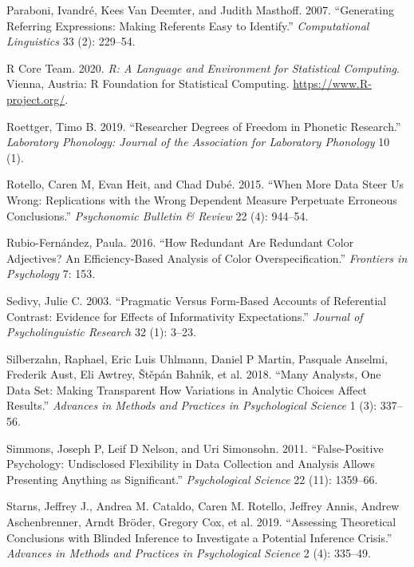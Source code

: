 \documentclass[
  12pt,
]{article}
\newlength{\cslhangindent}
\newenvironment{CSLReferences}[2] %
 {%
  \setlength{\parindent}{0pt}
  \ifodd #1 \everypar{\setlength{\hangindent}{\cslhangindent}}\ignorespaces\fi
  \ifnum #2 > 0
  \setlength{\parskip}{#2\baselineskip}
  \fi
 }%
 {}
\begin{document}
\begin{CSLReferences}{1}{0}
\leavevmode{}%
Paraboni, Ivandré, Kees Van Deemter, and Judith Masthoff. 2007. {``Generating Referring Expressions: Making Referents Easy to Identify.''} \emph{Computational Linguistics} 33 (2): 229--54.

\leavevmode{}%
R Core Team. 2020. \emph{R: A Language and Environment for Statistical Computing}. Vienna, Austria: R Foundation for Statistical Computing. \url{https://www.R-project.org/}.

\leavevmode{}%
Roettger, Timo B. 2019. {``Researcher Degrees of Freedom in Phonetic Research.''} \emph{Laboratory Phonology: Journal of the Association for Laboratory Phonology} 10 (1).

\leavevmode{}%
Rotello, Caren M, Evan Heit, and Chad Dubé. 2015. {``When More Data Steer Us Wrong: {R}eplications with the Wrong Dependent Measure Perpetuate Erroneous Conclusions.''} \emph{Psychonomic Bulletin \& Review} 22 (4): 944--54.

\leavevmode{}%
Rubio-Fernández, Paula. 2016. {``How Redundant Are Redundant Color Adjectives? An Efficiency-Based Analysis of Color Overspecification.''} \emph{Frontiers in Psychology} 7: 153.

\leavevmode{}%
Sedivy, Julie C. 2003. {``Pragmatic Versus Form-Based Accounts of Referential Contrast: Evidence for Effects of Informativity Expectations.''} \emph{Journal of Psycholinguistic Research} 32 (1): 3--23.

\leavevmode{}%
Silberzahn, Raphael, Eric Luis Uhlmann, Daniel P Martin, Pasquale Anselmi, Frederik Aust, Eli Awtrey, Štěpán Bahnı́k, et al. 2018. {``Many Analysts, One Data Set: Making Transparent How Variations in Analytic Choices Affect Results.''} \emph{Advances in Methods and Practices in Psychological Science} 1 (3): 337--56.

\leavevmode{}%
Simmons, Joseph P, Leif D Nelson, and Uri Simonsohn. 2011. {``False-Positive Psychology: Undisclosed Flexibility in Data Collection and Analysis Allows Presenting Anything as Significant.''} \emph{Psychological Science} 22 (11): 1359--66.

\leavevmode{}%
Starns, Jeffrey J., Andrea M. Cataldo, Caren M. Rotello, Jeffrey Annis, Andrew Aschenbrenner, Arndt Bröder, Gregory Cox, et al. 2019. {``Assessing Theoretical Conclusions with Blinded Inference to Investigate a Potential Inference Crisis.''} \emph{Advances in Methods and Practices in Psychological Science} 2 (4): 335--49.


\end{CSLReferences}
\end{document}
